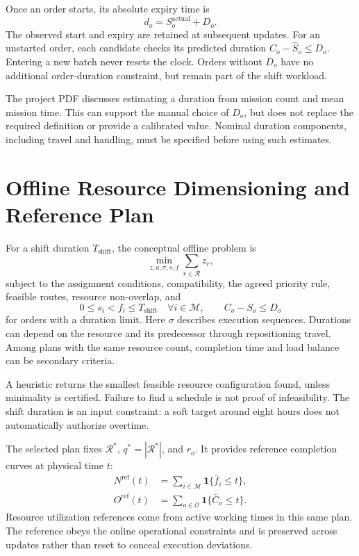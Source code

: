 Once an order starts, its absolute expiry time is
\begin{equation}
 d_o=S_o^{\mathrm{actual}}+D_o.
\end{equation}
The observed start and expiry are retained at subsequent updates. For an
unstarted order, each candidate checks its predicted duration
$\widehat C_o-\widehat S_o\leq D_o$. Entering a new batch never resets the
clock. Orders without $D_o$ have no additional order-duration constraint,
but remain part of the shift workload.

The project PDF discusses estimating a duration from mission count and mean
mission time. This can support the manual choice of $D_o$, but does not
replace the required definition or provide a calibrated value. Nominal
duration components, including travel and handling, must be specified before
using such estimates.

\section{Offline Resource Dimensioning and Reference Plan}

For a shift duration $T_{\mathrm{shift}}$, the conceptual offline problem is
\begin{equation}
 \min_{z,a,\sigma,s,f}\sum_{r\in\mathcal R}z_r,
\end{equation}
subject to the assignment conditions, compatibility, the agreed priority
rule, feasible routes, resource non-overlap, and
\begin{equation}
 0\leq s_i<f_i\leq T_{\mathrm{shift}}\quad\forall i\in\mathcal M,
 \qquad C_o-S_o\leq D_o
\end{equation}
for orders with a duration limit. Here $\sigma$ describes execution sequences.
Durations can depend on the resource and its predecessor through repositioning
travel. Among plans with the same resource count, completion time and load
balance can be secondary criteria.

A heuristic returns the smallest feasible resource configuration found,
unless minimality is certified. Failure to find a schedule is not proof of
infeasibility. The shift duration is an input constraint: a soft target around
eight hours does not automatically authorize overtime.

The selected plan fixes $\mathcal R^*$, $q^*=|\mathcal R^*|$, and $r_o$.
It provides reference completion curves at physical time $t$:
\begin{align}
 N^{\mathrm{ref}}(t)&=\sum_{i\in\mathcal M}\mathbf1\{\bar f_i\leq t\},\\
 O^{\mathrm{ref}}(t)&=\sum_{o\in\mathcal O}\mathbf1\{\bar C_o\leq t\}.
\end{align}
Resource utilization references come from active working times in this same
plan. The reference obeys the online operational constraints and is preserved
across updates rather than reset to conceal execution deviations.

